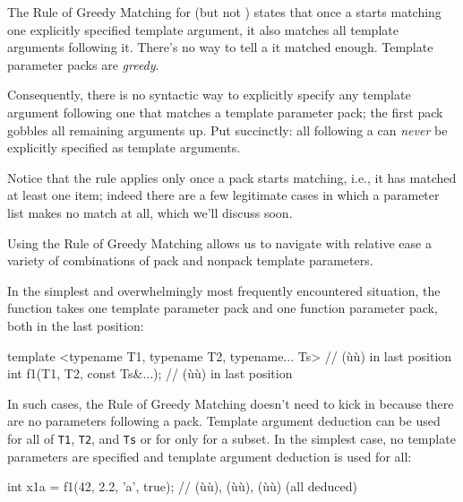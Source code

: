 The Rule of Greedy Matching for  (but
not ) states that once a
 starts matching one explicitly
specified template argument, it also matches all template arguments
following it. There's no way to tell a 
it matched enough. Template parameter packs are \emph{greedy}.

Consequently, there is no syntactic way to explicitly specify any
template argument following one that matches a template parameter pack;
the first pack gobbles all remaining arguments up. Put succinctly: all
 following a  can \emph{never} be explicitly specified as template arguments.

Notice that the rule applies only once a pack starts matching, i.e., it
has matched at least one item; indeed there are a few legitimate cases
in which a parameter list makes no match at all, which we'll discuss
soon.

Using the Rule of Greedy Matching allows us to navigate with relative
ease a variety of combinations of pack and nonpack template parameters.

In the simplest and overwhelmingly most frequently encountered
situation, the function takes one template parameter pack and one
function parameter pack, both in the last position:

\begin{emcppslisting}
template <typename T1, typename T2, typename... Ts>  // (ù{}ù) in last position
int f1(T1, T2, const Ts&...);                        // (ù{}ù) in last position
\end{emcppslisting}
    

\noindent In such cases, the Rule of Greedy Matching doesn't need to kick in
because there are no parameters following a pack. Template argument
deduction can be used for all of \lstinline!T1!, \lstinline!T2!, and
\lstinline!Ts! or for only for a subset. In the simplest case, no template
parameters are specified and template argument deduction is used for
all:

\begin{emcppslisting}
int x1a = f1(42, 2.2, 'a', true);
    // (ù{}ù), (ù{}ù), (ù{}ù) (all deduced)
\end{emcppslisting}
    

